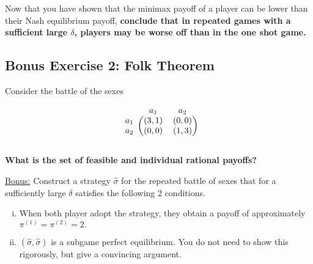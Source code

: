 \documentclass[10pt]{article}
\begin{document}
Now that you have shown that the minimax payoff of a player can be lower than
their Nash equilibrium payoff, \textbf{conclude that in repeated games with a sufficient
large \(\delta\), players may be worse off than in the one shot game.}

\subsection*{Bonus Exercise 2: Folk Theorem}

Consider the battle of the sexes

\begin{equation*}
    \begin{blockarray}{ccc}
        & a_1 & a_2 \\
        \begin{block}{c(cc)}
            a_1 & (3, 1) & (0, 0) \\
            a_2 & (0, 0) & (1, 3) \\
        \end{block}
    \end{blockarray}
\end{equation*}

\textbf{What is the set of feasible and individual rational payoffs?}

\underline{Bonus:} Construct a strategy \(\hat{\sigma}\) for the repeated battle of sexes
that for a sufficiently large \(\delta\) satisfies the following 2 conditions.

\begin{enumerate}[(i)]
    \item When both player adopt the strategy, they obtain a payoff of approximately
    \(\pi^{(1)} = \pi^{(2)} = 2.\)
    \item \((\hat{\sigma}, \hat{\sigma})\) is a subgame perfect equilibrium.
    You do not need to show this rigorously, but give a convincing argument.
\end{enumerate}
\end{document}
